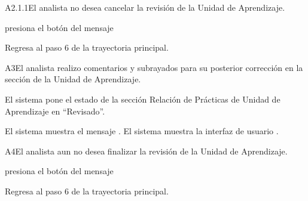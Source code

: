 	
\begin{UCtrayectoriaA}{A2.1.1}{El analista no desea cancelar la revisión de la Unidad de Aprendizaje.} 

	\hypertarget{SP2-CU7-A2.1.1}{\UCpaso[\UCactor] presiona el botón  del mensaje }
    \UCpaso Regresa al paso 6 de la trayectoria principal. 
\end{UCtrayectoriaA}

	
\begin{UCtrayectoriaA}{A3}{El analista realizo comentarios y subrayados para su posterior corrección en la sección de la Unidad de Aprendizaje.} 

	\hypertarget{SP2-CU7-A3}{\UCpaso El sistema pone el estado de la sección Relación de Prácticas de Unidad de Aprendizaje en “Revisado”.}
    \UCpaso El sistema muestra el mensaje .
    \UCpaso El sistema muestra la interfaz de usuario .
\end{UCtrayectoriaA}

	
\begin{UCtrayectoriaA}{A4}{El analista aun no desea finalizar la revisión de la Unidad de Aprendizaje.} 

	\hypertarget{SP2-CU7-A4}{\UCpaso[\UCactor] presiona el botón  del mensaje }
    \UCpaso Regresa al paso 6 de la trayectoria principal. 
\end{UCtrayectoriaA}